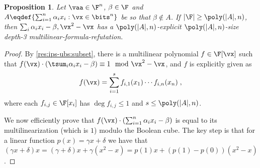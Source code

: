 \documentclass[11pt]{article}
\numberwithin{equation}{section}
\newtheorem{proposition}[theorem]{Proposition}
\theoremstyle{definition}
\theoremstyle{plain}
\begin{document}
\begin{proposition}\label{res:ips-ubs:subset:mult-form}
        Let $\vaa\in\F^n$, $\beta\in\F$ and $A\eqdef\{\sum_{i=1}^n \alpha_i x_i : \vx\in\bits^n\}$ be so that $\beta\notin A$.  If $|\F|\ge \poly(|A|,n)$, then $\sum_i \alpha_ix_i-\beta,\vx^2-\vx$ has a $\poly(|A|,n)$-explicit $\poly(|A|,n)$-size depth-3 multilinear-formula-\lIPS refutation.
\end{proposition}
\begin{proof}
        By \autoref{res:ips-ubs:subset}, there is a multilinear polynomial $f\in\F[\vx]$ such that $f(\vx)\cdot \left(\tsum_i \alpha_i x_i-\beta\right)\equiv 1\mod  \vx^2-\vx$, and $f$ is explicitly given as
        \[
                f(\vx)=\sum_{i=1}^s f_{i,1}(x_1)\cdots f_{i,n}(x_n)
                \;,
        \]
        where each $f_{i,j}\in\F[x_i]$ has $\deg f_{i,j}\le 1$ and $s\le \poly(|A|,n)$.

        We now efficiently prove that $f(\vx)\cdot (\sum_{i=1}^n \alpha_i x_i-\beta)$ is equal to its multilinearization (which is $1$) modulo the Boolean cube. The key step is that for a linear function $p(x)=\gamma x+\delta$ we have that $(\gamma x+\delta)x=(\gamma+\delta)x+\gamma(x^2-x)=p(1)x+(p(1)-p(0))(x^2-x)$.


\end{proof}
\end{document}
